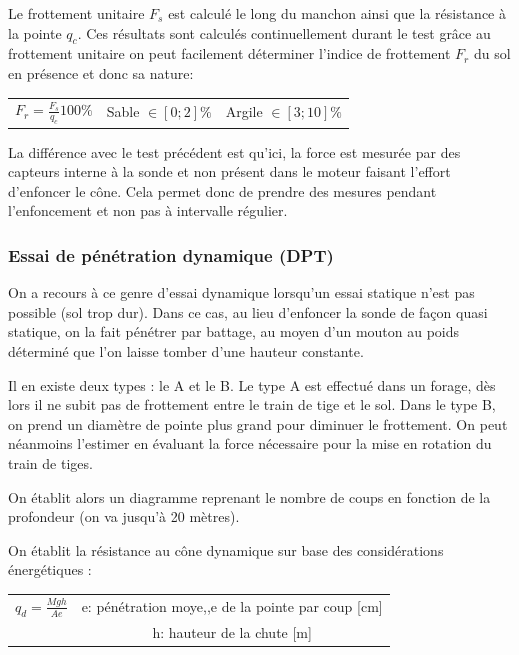             Le frottement unitaire $F_s$ est calculé le long du manchon ainsi que la résistance à la pointe $q_c$. Ces résultats sont calculés continuellement durant le test grâce au frottement unitaire on peut facilement déterminer l'indice de frottement $F_r$ du sol en présence et donc sa nature:
            
            \begin{center}
                \begin{tabular}{ccc}
                    $F_r = \frac{F_s}{q_c}100\%$ \: \: & Sable $\in [0; 2]\%$ \: \: & Argile $\in [3; 10]\%$
                \end{tabular}
            \end{center} 
            
            La différence avec le test précédent est qu'ici, la force est mesurée par des capteurs interne à la sonde et non présent dans le moteur faisant l'effort d'enfoncer le cône. Cela permet donc de prendre des mesures pendant l'enfoncement et non pas à intervalle régulier.
            
        \subsubsection{Essai de pénétration dynamique (DPT)}
        
            On a recours à ce genre d'essai dynamique lorsqu'un essai statique n'est pas possible (sol trop dur). Dans ce cas, au lieu d'enfoncer la sonde de façon quasi statique, on la fait pénétrer par battage, au moyen d'un mouton au poids déterminé que l'on laisse tomber d'une hauteur constante.
            
            Il en existe deux types : le A et le B. Le type A est effectué dans un forage, dès lors il ne subit pas de frottement entre le train de tige et le sol. Dans le type B, on prend un diamètre de pointe plus grand pour diminuer le frottement. On peut néanmoins l'estimer en évaluant la force nécessaire pour la mise en rotation du train de tiges.
            
            On établit alors un diagramme reprenant le nombre de coups en fonction de la profondeur (on va jusqu'à 20 mètres).
            
            On établit la résistance au cône dynamique sur base des considérations énergétiques :
    
            \medskip
            \begin{center}
            \begin{tabular}{c|c}
                $q_d = \frac{Mgh}{Ae}$ \: \:  &  e: pénétration moye,,e de la pointe par coup [cm]  \\
                          &  h: hauteur de la chute [m] 
            \end{tabular}
            \end{center} 
            

